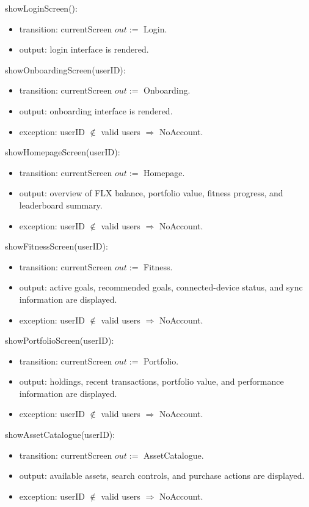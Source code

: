 \documentclass[12pt, titlepage]{article}
\begin{document}
\noindent showLoginScreen():
\begin{itemize}
\item transition: currentScreen $\mathit{out} :=$ Login.
\item output: login interface is rendered.
\end{itemize}

\noindent showOnboardingScreen(userID):
\begin{itemize}
\item transition: currentScreen $\mathit{out} :=$ Onboarding.
\item output: onboarding interface is rendered.
\item exception: userID $\notin$ valid users $\Rightarrow$ NoAccount.
\end{itemize}

\noindent showHomepageScreen(userID):
\begin{itemize}
\item transition: currentScreen $\mathit{out} :=$ Homepage.
\item output: overview of FLX balance, portfolio value, fitness progress, and leaderboard summary.
\item exception: userID $\notin$ valid users $\Rightarrow$ NoAccount.
\end{itemize}

\noindent showFitnessScreen(userID):
\begin{itemize}
\item transition: currentScreen $\mathit{out} :=$ Fitness.
\item output: active goals, recommended goals, connected-device status, and sync information are displayed.
\item exception: userID $\notin$ valid users $\Rightarrow$ NoAccount.
\end{itemize}

\noindent showPortfolioScreen(userID):
\begin{itemize}
\item transition: currentScreen $\mathit{out} :=$ Portfolio.
\item output: holdings, recent transactions, portfolio value, and performance information are displayed.
\item exception: userID $\notin$ valid users $\Rightarrow$ NoAccount.
\end{itemize}

\noindent showAssetCatalogue(userID):
\begin{itemize}
\item transition: currentScreen $\mathit{out} :=$ AssetCatalogue.
\item output: available assets, search controls, and purchase actions are displayed.
\item exception: userID $\notin$ valid users $\Rightarrow$ NoAccount.
\end{itemize}
\end{document}
